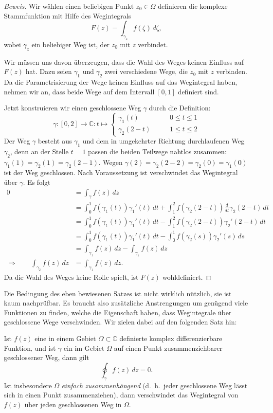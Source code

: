 \begin{proof}[Beweis]
Wir wählen einen beliebigen Punkt $z_0\in\Omega$ definieren die
komplexe Stammfunktion mit Hilfe des Wegintegrals
\[
F(z)=\int_{\gamma_z} f(\zeta)\,d\zeta,
\]
wobei $\gamma_z$ ein beliebiger Weg ist, der $z_0$ mit $z$ verbindet.

Wir müssen uns davon überzeugen, dass die Wahl des Weges keinen Einfluss
auf $F(z)$ hat.
Dazu seien $\gamma_1$ und $\gamma_2$ zwei verschiedene Wege, die
$z_0$ mit $z$ verbinden.
Da die Parametrisierung der Wege keinen Einfluss auf das Wegintegral haben,
nehmen wir an, dass beide Wege auf dem Intervall $[0,1]$ definiert sind.

Jetzt konstruieren wir einen geschlossene Weg $\gamma$ durch die
Definition:
\[
\gamma\colon[0,2]\to\mathbb C:t\mapsto
\begin{cases}
\gamma_1(t)&\qquad 0\le t\le 1\\
\gamma_2(2-t)&\qquad 1\le t\le 2
\end{cases}
\]
Der Weg $\gamma$ besteht aus $\gamma_1$ und dem in umgekehrter Richtung
durchlaufenen Weg $\gamma_2$, denn an der Stelle $t=1$ passen die
beiden Teilwege nahtlos zusammen: $\gamma_1(1)=\gamma_2(1)=\gamma_2(2-1)$.
Wegen $\gamma(2)=\gamma_2(2-2)=\gamma_2(0)=\gamma_1(0)$ ist der
Weg geschlossen.
Nach Voraussetzung ist verschwindet das Wegintegral über $\gamma$.
Es folgt
\begin{align*}
0
&=
\int_{\gamma}f(z)\,dz
\\
&=
\int_0^1 f(\gamma_1(t))\gamma_1'(t)\,dt
+ \int_1^2f(\gamma_2(2-t))\frac{d}{dt}\gamma_2(2-t)\,dt
\\
&=
\int_0^1 f(\gamma_1(t))\gamma_1'(t)\,dt
- \int_1^2f(\gamma_2(2-t))\gamma_2'(2-t)\,dt
\\
&=
\int_0^1 f(\gamma_1(t))\gamma_1'(t)\,dt
- \int_0^1f(\gamma_2(s))\gamma_2'(s)\,ds
\\
&=
\int_{\gamma_1}f(z)\,dz - \int_{\gamma_2}f(z)\,dz
\\
\Rightarrow\qquad
\int_{\gamma_2}f(z)\,dz&=\int_{\gamma_1}f(z)\,dz.
\end{align*}
Da die Wahl des Weges keine Rolle spielt, ist $F(z)$ wohldefiniert.
\end{proof}

Die Bedingung des eben bewiesenen Satzes ist nicht wirklich nützlich,
sie ist kaum nachprüfbar.
Es braucht also zusätzliche Anstrengungen um genügend viele
Funktionen zu finden, welche die Eigenschaft haben, dass Wegintegrale
über geschlossene Wege verschwinden.
Wir zielen dabei auf den folgenden Satz hin:
\begin{satz}[Cauchy]
Ist $f(z)$ eine in einem Gebiet $\Omega\subset\mathbb C$ definierte
komplex differenzierbare Funktion, und ist $\gamma$ ein im Gebiet
$\Omega$ auf einen Punkt zusammenziehbarer geschlossener Weg, dann gilt
\[
\oint_{\gamma}f(z)\,dz=0.
\]
Ist insbesondere $\Omega$ {\em einfach zusammenhängend}
%
%
(d.~h.~jeder geschlossene Weg lässt sich in einen Punkt zusammenziehen),
dann verschwindet das Wegintegral von $f(z)$ über jeden geschlossenen
Weg in $\Omega$.
\end{satz}


